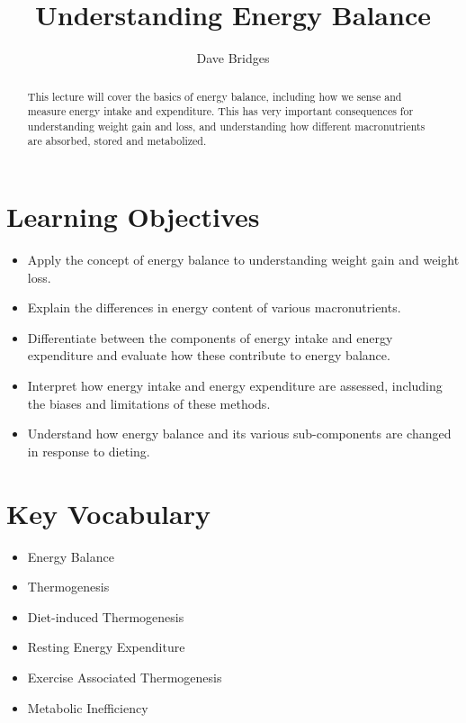 \documentclass{tufte-handout}
\title{Understanding Energy Balance}
\author{Dave Bridges}
\begin{document}
\maketitle%

\begin{abstract}
\noindent This lecture will cover the basics of energy balance, including how we sense and measure energy intake and expenditure.  This has very important consequences for understanding weight gain and loss, and understanding how different macronutrients are absorbed, stored and metabolized.
\end{abstract}

\tableofcontents

\pagebreak{}
\section{Learning Objectives}

\begin{itemize}
\item Apply the concept of energy balance to understanding weight gain and weight loss.
\item Explain the differences in energy content of various macronutrients.
\item Differentiate between the components of energy intake and energy expenditure and evaluate how these contribute to energy balance.
\item Interpret how energy intake and energy expenditure are assessed, including the biases and limitations of these methods.
\item Understand how energy balance and its various sub-components are changed in response to dieting.

\end{itemize}

\section{Key Vocabulary}
\begin{itemize}
	\item Energy Balance
	\item Thermogenesis
	\item Diet-induced Thermogenesis
	\item Resting Energy Expenditure
	\item Exercise Associated Thermogenesis
	\item Metabolic Inefficiency

\end{itemize}
\end{document}

